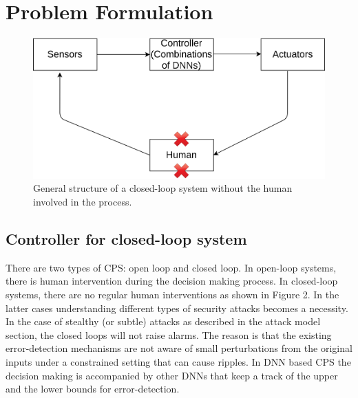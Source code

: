 


\section{Problem Formulation}

\begin{figure}
	\centering
	\includegraphics[width=0.7\linewidth]{Images/Systemsdescription}
	\caption[Closed-loop system]{General structure of a closed-loop system without the human involved in the process.}
	\label{fig:systemsdescription}
\end{figure}
\iffalse
\subsection{Controller for closed-loop system}
There are two types of CPS: open loop and closed loop. In open-loop systems, there is human intervention during the decision making process. In closed-loop systems, there are no regular human interventions as shown in Figure 2. In the latter cases understanding different types of security attacks becomes a necessity. In the case of stealthy (or subtle) attacks as described in the attack model section, the closed loops will not raise alarms. The reason is that the existing error-detection mechanisms are not aware of small perturbations from the original inputs under a constrained setting that can cause ripples. In DNN based CPS the decision making is accompanied by other DNNs that keep a track of the upper and the lower bounds for error-detection. 

